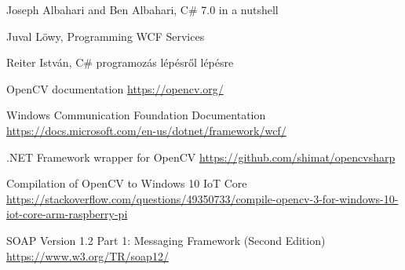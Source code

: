 \begin{thebibliography}{4}

Joseph Albahari and Ben Albahari, C\# 7.0 in a nutshell 

Juval Löwy, Programming WCF Services

 Reiter István, C\# programozás lépésről lépésre 

 OpenCV documentation \url{https://opencv.org/}

 Windows Communication Foundation Documentation \url{https://docs.microsoft.com/en-us/dotnet/framework/wcf/}

 .NET Framework wrapper for OpenCV \url{https://github.com/shimat/opencvsharp}

 Compilation of OpenCV to Windows 10 IoT Core \\ \url{https://stackoverflow.com/questions/49350733/compile-opencv-3-for-windows-10-iot-core-arm-raspberry-pi}

 SOAP Version 1.2 Part 1: Messaging Framework (Second Edition) \\ 
\url{https://www.w3.org/TR/soap12/}

\end{thebibliography}

